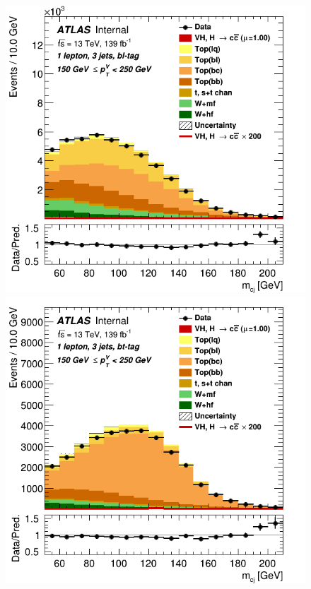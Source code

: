 \begin{figure}[h!]
\includegraphics[scale=0.2]{Images/VH/SRsandTopCRs/Region_distmBB_DtopCRBL_BMax250_L1_Y6051_TTypebl_T1_J3_BMin150_Prefit.png}
\includegraphics[scale=0.2]{Images/VH/SRsandTopCRs/Region_distmBB_DtopCRBC_BMax250_L1_Y6051_TTypebt_T1_J3_BMin150_Prefit.png}

\end{figure}
